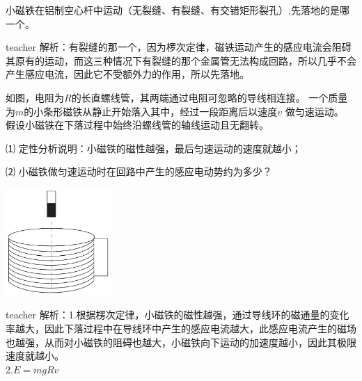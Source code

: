 \begin{example}

小磁铁在铝制空心杆中运动（无裂缝、有裂缝、有交错矩形裂孔）,先落地的是哪一个。
\begin{taggedblock}{teacher}
\newline
解析：有裂缝的那一个，因为椤次定律，磁铁运动产生的感应电流会阻碍其原有的运动，而这三种情况下有裂缝的那个金属管无法构成回路，所以几乎不会产生感应电流，因此它不受额外力的作用，所以先落地。
\end{taggedblock}
\end{example}



\begin{example}
如图，电阻为$R$的长直螺线管，其两端通过电阻可忽略的导线相连接。
一个质量为$m$的小条形磁铁从静止开始落入其中，经过一段距离后以速度$v$ 做匀速运动。
假设小磁铁在下落过程中始终沿螺线管的轴线运动且无翻转。
 
⑴ 定性分析说明：小磁铁的磁性越强，最后匀速运动的速度就越小；

⑵ 小磁铁做匀速运动时在回路中产生的感应电动势约为多少？

\begin{flushright}
\includegraphics[width = 0.3\textwidth]{images/mag-34.pdf} 
\end{flushright}


\begin{taggedblock}{teacher}
\noindent
解析：1.根据楞次定律，小磁铁的磁性越强，通过导线环的磁通量的变化率越大，因此下落过程中在导线环中产生的感应电流越大，此感应电流产生的磁场也越强，从而对小磁铁的阻碍也越大，小磁铁向下运动的加速度越小，因此其极限速度就越小。
\\2.$E=mgRv$
\end{taggedblock}
\end{example}


